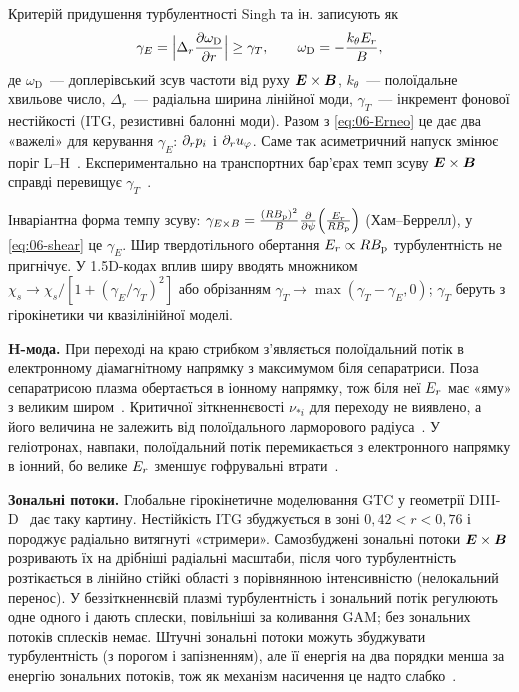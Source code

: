 Критерій придушення турбулентності Singh та ін. записують як~\cite[рівн.~1]{Singh2004}
\begin{equation}\label{eq:06-shear}
  \gamma_E=\Bigl|\Delta_r\frac{\partial\omega_{\mathrm D}}{\partial r}\Bigr|\ge\gamma_T,\qquad \omega_{\mathrm D}=-\frac{k_\theta E_{r}}{B},
\end{equation}
де $\omega_{\mathrm D}$~--- доплерівський зсув частоти від руху $\bm{E}\times\bm{B}$, $k_\theta$~--- полоїдальне хвильове число, $\Delta_r$~--- радіальна ширина лінійної моди, $\gamma_T$~--- інкремент фонової нестійкості (ITG, резистивні балонні моди). Разом з \eqref{eq:06-Erneo} це дає два «важелі» для керування $\gamma_E$: $\partial_rp_i$ і $\partial_ru_{\varphi}$. Саме так асиметричний напуск змінює поріг L--H~\cite{Singh2004}. Експериментально на транспортних бар'єрах темп зсуву $\bm{E}\times\bm{B}$ справді перевищує $\gamma_T$~\cite{Ida2001}.

\begin{outofcorpus}
Інваріантна форма темпу зсуву: $\gamma_{E\times B}=\frac{(RB_{\mathrm{p}})^2}{B}\frac{\partial}{\partial\psi}\Bigl(\frac{E_{r}}{RB_{\mathrm{p}}}\Bigr)$ (Хам--Беррелл), у \eqref{eq:06-shear} це $\gamma_E$. Шир твердотільного обертання $E_{r}\propto RB_{\mathrm{p}}$ турбулентність не пригнічує. У 1.5D-кодах вплив ширу вводять множником $\chi_s\to\chi_s/[1+(\gamma_E/\gamma_T)^2]$ або обрізанням $\gamma_T\to\max(\gamma_T-\gamma_E,0)$; $\gamma_T$ беруть з гірокінетики чи квазілінійної моделі.
\end{outofcorpus}

\textbf{H-мода.} При переході на краю стрибком з'являється полоїдальний потік в електронному діамагнітному напрямку з максимумом біля сепаратриси. Поза сепаратрисою плазма обертається в іонному напрямку, тож біля неї $E_{r}$ має «яму» з великим широм~\cite{Ida2001}. Критичної зіткненнєвості $\nu_{*i}$ для переходу не виявлено, а його величина не залежить від полоїдального ларморового радіуса~\cite{Ida2001}. У геліотронах, навпаки, полоїдальний потік перемикається з електронного напрямку в іонний, бо велике $E_{r}$ зменшує гофрувальні втрати~\cite{Ida2001}.

\textbf{Зональні потоки.} Глобальне гірокінетичне моделювання GTC у геометрії DIII-D~\cite[с.~15--18]{Wang2006} дає таку картину. Нестійкість ITG збуджується в зоні $0{,}42<r<0{,}76$ і породжує радіально витягнуті «стримери». Самозбуджені зональні потоки $\bm{E}\times\bm{B}$ розривають їх на дрібніші радіальні масштаби, після чого турбулентність розтікається в лінійно стійкі області з порівнянною інтенсивністю (нелокальний перенос). У беззіткненнєвій плазмі турбулентність і зональний потік регулюють одне одного і дають сплески, повільніші за коливання GAM; без зональних потоків сплесків немає. Штучні зональні потоки можуть збуджувати турбулентність (з порогом і запізненням), але її енергія на два порядки менша за енергію зональних потоків, тож як механізм насичення це надто слабко~\cite{Wang2006}.

